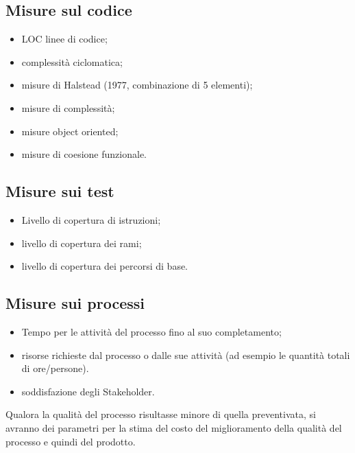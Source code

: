 \subsection{Misure sul codice}

\begin{itemize}
  
\item LOC linee di codice;
\item complessit\`a ciclomatica;
\item misure di Halstead (1977, combinazione di 5 elementi);
\item misure di complessit\`a;
\item misure object oriented;
\item misure di coesione funzionale.

\end{itemize}


\subsection{Misure sui test}

\begin{itemize}
  
\item Livello di copertura di istruzioni;
\item livello di copertura dei rami;
\item livello di copertura dei percorsi di base.
\end{itemize}



  
\subsection{Misure sui processi} 

\begin{itemize} 
\item Tempo per le attivit\`a del processo fino al suo completamento;
\item risorse richieste dal processo o dalle sue attivit\`a (ad esempio le
quantit\`a totali di ore/persone).
\item soddisfazione degli Stakeholder.  
\end{itemize}

Qualora la qualit\`a del processo risultasse minore di quella preventivata,
si avranno dei parametri per la stima del costo del miglioramento della qualit\`a
del processo e quindi del prodotto.



